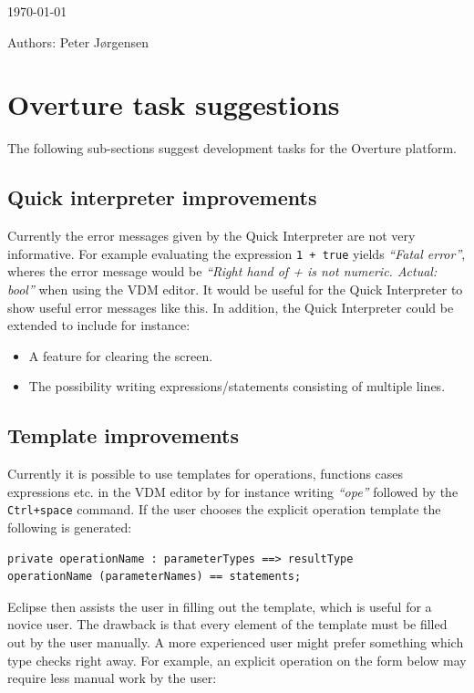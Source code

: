 \documentclass[11pt]{report}
\begin{document}
\today

Authors: Peter J\o rgensen

\section*{Overture task suggestions}

The following sub-sections suggest development tasks for the Overture platform.

\subsection*{Quick interpreter improvements}

Currently the error messages given by the Quick Interpreter are not very informative. For example evaluating the expression \texttt{1 + true} yields \textit{``Fatal error''}, wheres the error message would be \textit{``Right hand of + is not numeric. Actual: bool''} when using the VDM editor. It would be useful for the Quick Interpreter to show useful error messages like this. In addition, the Quick Interpreter could be extended to include for instance:

\begin{itemize}

\item A feature for clearing the screen.

\item The possibility writing expressions/statements consisting of multiple lines.

\end{itemize}


\subsection*{Template improvements}

Currently it is possible to use templates for operations, functions cases expressions etc. in the VDM editor by for instance writing \textit{``ope''} followed by the \texttt{Ctrl+space} command. If the user chooses the explicit operation template the following is generated:

\begin{lstlisting}
private operationName : parameterTypes ==> resultType
operationName (parameterNames) == statements;
\end{lstlisting}

Eclipse then assists the user in filling out the template, which is useful for a novice user. The drawback is that every element of the template must be filled out by the user manually. A more experienced user might prefer something which type checks right away. For example, an explicit operation on the form below may require less manual work by the user:
\end{document}
